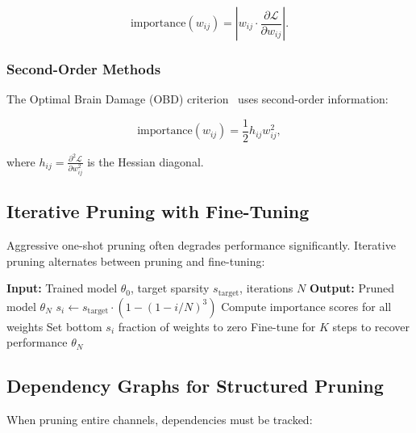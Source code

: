 \documentclass[12pt]{report}
\theoremstyle{definition}
\newcommand{\loss}{\mathcal{L}}
\begin{document}
\begin{equation}
\text{importance}(w_{ij}) = \left|w_{ij} \cdot \frac{\partial \loss}{\partial w_{ij}}\right|.
\label{eq:importance_gradient}
\end{equation}

\subsubsection{Second-Order Methods}

The Optimal Brain Damage (OBD) criterion~\citep{lecun1990optimal} uses second-order information:

\begin{equation}
\text{importance}(w_{ij}) = \frac{1}{2} h_{ij} w_{ij}^2,
\label{eq:importance_obd}
\end{equation}

where $h_{ij} = \frac{\partial^2 \loss}{\partial w_{ij}^2}$ is the Hessian diagonal.

\subsection{Iterative Pruning with Fine-Tuning}

Aggressive one-shot pruning often degrades performance significantly. Iterative pruning alternates between pruning and fine-tuning:

\begin{algorithm}[H]
\caption{Iterative Magnitude Pruning}
\label{alg:iterative_pruning}
\begin{algorithmic}[1]
\STATE \textbf{Input:} Trained model $\theta_0$, target sparsity $s_{\text{target}}$, iterations $N$
\STATE \textbf{Output:} Pruned model $\theta_N$
    \STATE $s_i \leftarrow s_{\text{target}} \cdot \left(1 - (1 - i/N)^3\right)$ 
    \STATE Compute importance scores for all weights
    \STATE Set bottom $s_i$ fraction of weights to zero
    \STATE Fine-tune for $K$ steps to recover performance
\ENDFOR
\RETURN $\theta_N$
\end{algorithmic}
\end{algorithm}

\subsection{Dependency Graphs for Structured Pruning}

When pruning entire channels, dependencies must be tracked:
\end{document}
